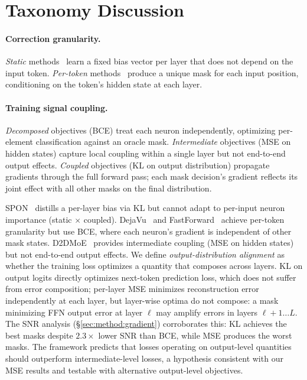 \section{Taxonomy Discussion}
\label{app:taxonomy}

\paragraph{Correction granularity.}
\emph{Static} methods~\cite{xu2025spon} learn a fixed bias vector per layer that does not depend on the input token.
\emph{Per-token} methods~\cite{liu2023dejavu,gautam2026fastforward,akhauri2024shadowllm,szatkowski2024d2dmoe} produce a unique mask for each input position, conditioning on the token's hidden state at each layer.

\paragraph{Training signal coupling.}
\emph{Decomposed} objectives (BCE) treat each neuron independently, optimizing per-element classification against an oracle mask.
\emph{Intermediate} objectives (MSE on hidden states) capture local coupling within a single layer but not end-to-end output effects.
\emph{Coupled} objectives (KL on output distribution) propagate gradients through the full forward pass; each mask decision's gradient reflects its joint effect with all other masks on the final distribution.

SPON~\cite{xu2025spon} distills a per-layer bias via KL but cannot adapt to per-input neuron importance (static $\times$ coupled).
DejaVu~\cite{liu2023dejavu} and FastForward~\cite{gautam2026fastforward} achieve per-token granularity but use BCE, where each neuron's gradient is independent of other mask states.
D2DMoE~\cite{szatkowski2024d2dmoe} provides intermediate coupling (MSE on hidden states) but not end-to-end output effects.
We define \emph{output-distribution alignment} as whether the training loss optimizes a quantity that composes across layers.
KL on output logits directly optimizes next-token prediction loss, which does not suffer from error composition; per-layer MSE minimizes reconstruction error independently at each layer, but layer-wise optima do not compose: a mask minimizing FFN output error at layer $\ell$ may amplify errors in layers $\ell{+}1 \ldots L$.
The SNR analysis (\S\ref{sec:method:gradient}) corroborates this: KL achieves the best masks despite $2.3\times$ lower SNR than BCE, while MSE produces the worst masks.
The framework predicts that losses operating on output-level quantities should outperform intermediate-level losses, a hypothesis consistent with our MSE results and testable with alternative output-level objectives.

